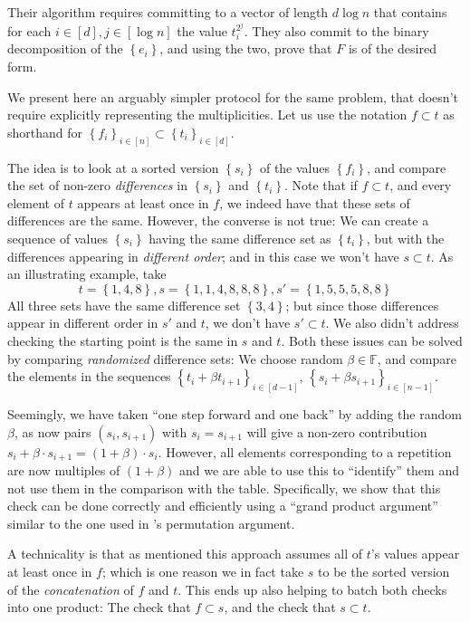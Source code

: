 \documentclass[11pt]{article} %
\newcommand{\F}{\ensuremath{\mathbb F}\xspace}
\newcommand{\sett}[2]{\ensuremath{\set{#1}_{#2}}\xspace}
\newcommand{\set}[1]{\ensuremath{\left\{#1\right\}}\xspace}
\begin{document}
Their algorithm requires committing to a vector of length $d\log n$ that contains
for each $i\in [d], j\in [\log n] $ the value $t_i^{2^j}$.
They also commit to the binary decomposition of the \set{e_i},
and using the two, prove that $F$ is of the desired form.

We present here an arguably simpler protocol for the same problem, that doesn't require explicitly representing the multiplicities. Let us use the notation
$f\subset t$ as shorthand for $\sett{f_i}{i\in [n]}\subset \sett{t_i}{i\in [d]}$.

The idea is to look at a sorted version \set{s_i} of the values \set{f_i},
and compare the set of non-zero \emph{differences} in \set{s_i}
and \set{t_i}. Note that if $f\subset t$, and every element of $t$ appears at least once in $f$, we indeed have that these sets of differences are the same. However, the converse is not true: We can create a sequence of values \set{s_i}
having the same difference set as \set{t_i}, but with the differences appearing in \emph{different order}; and in this case we won't have $s\subset t$.
As an illustrating example, take
\[t=\set{1,4,8}, s = \set{1,1,4,8,8,8}, s' = \set{1,5,5,5,8,8}\]
All three sets have the same difference set \set{3,4}; but since those differences appear in different order in $s'$ and $t$, we don't have $s'\subset t$. We also didn't address checking the starting point is the same in $s$ and $t$.
Both these issues can be solved by comparing \emph{randomized} difference sets:
We choose random $\beta \in \F$, and compare the elements in the sequences 
\sett{t_i+\beta t_{i+1}}{i\in [d-1]}, \sett{s_i +\beta s_{i+1}}{i\in [n-1]}.


Seemingly, we have taken ``one step forward and one back'' by adding the random $\beta$, as now pairs $(s_i,s_{i+1})$ with $s_i=s_{i+1}$ will give a non-zero contribution $s_i+\beta \cdot s_{i+1} = (1+\beta)\cdot s_i$. However, all elements corresponding to a repetition are now multiples of $(1+\beta)$ and we are able to use this to ``identify'' them and not use them in the comparison with the table.
Specifically, we show that this check can be done correctly and efficiently using a ``grand product argument'' similar to the one used in \cite{plonk}'s permutation argument.


A technicality is that as mentioned this approach assumes all of $t$'s values appear at least once in $f$; which is one reason we in fact take $s$ to be the sorted version of the \emph{concatenation} of $f$ and $t$. This ends up also helping to batch both checks into one product: The check that $f\subset s$, and the check that $s\subset t$.
\end{document}
